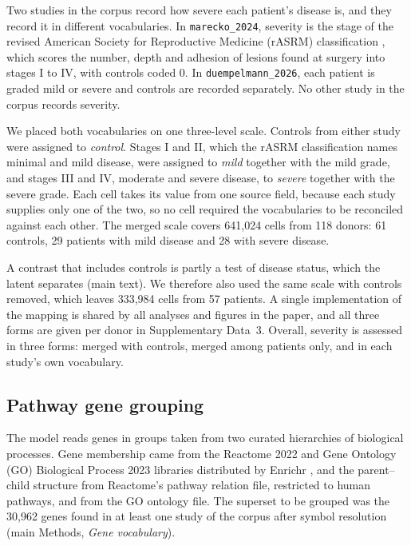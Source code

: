 Two studies in the corpus record how severe each patient's disease is, and
they record it in different vocabularies. In \texttt{marecko\_2024},
severity is the stage of the revised American Society for Reproductive
Medicine (rASRM) classification \citep{asrm1997revised}, which scores the
number, depth and adhesion of lesions found at surgery into stages I to
IV, with controls coded 0. In \texttt{duempelmann\_2026}, each patient is
graded mild or severe and controls are recorded separately. No other study
in the corpus records severity.

We placed both vocabularies on one three-level scale. Controls from either
study were assigned to \emph{control}. Stages I and II, which the rASRM
classification names minimal and mild disease, were assigned to
\emph{mild} together with the mild grade, and stages III and IV, moderate
and severe disease, to \emph{severe} together with the severe grade. Each
cell takes its value from one source field, because each study supplies
only one of the two, so no cell required the vocabularies to be reconciled
against each other. The merged scale covers 641{,}024 cells from 118
donors: 61 controls, 29 patients with mild disease and 28 with severe
disease.

A contrast that includes controls is partly a test of disease status,
which the latent separates (main text). We therefore also used the
same scale with controls removed, which leaves 333{,}984 cells from 57
patients. A single implementation of the mapping is shared by all 
analyses and figures in the paper, and all three forms are given per 
donor in Supplementary Data~3. Overall, severity is assessed
in three forms: merged with controls, merged among patients only, and in
each study's own vocabulary.

\subsection{Pathway gene grouping}
\label{smeth:grouping}

The model reads genes in groups taken from two curated hierarchies of
biological processes. Gene membership came from the Reactome 2022
\citep{gillespie2022reactome} and Gene Ontology (GO) Biological Process
2023 \citep{go2023knowledgebase} libraries distributed by Enrichr
\citep{kuleshov2016enrichr}, and the parent--child structure from
Reactome's pathway relation file, restricted to human pathways, and from
the GO ontology file. The superset to be grouped was the 30{,}962 genes
found in at least one study of the corpus after symbol resolution (main
Methods, \emph{Gene vocabulary}).


